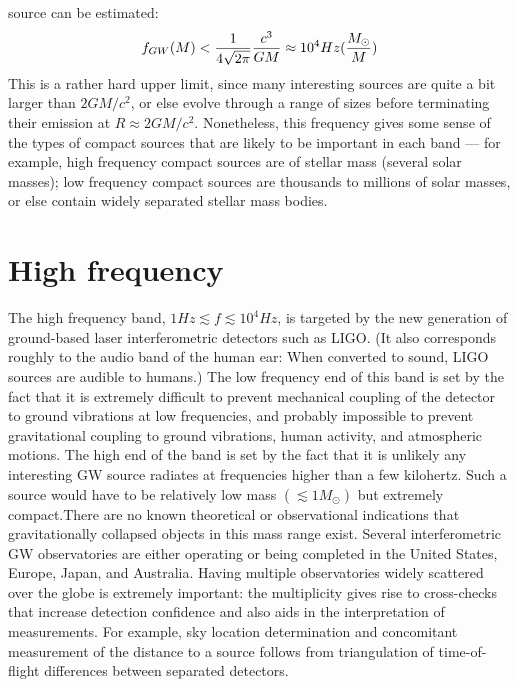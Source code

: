 \documentclass[binding=0.6cm, LaM]{sapthesis}
\begin{document}
 source can be estimated:
\begin{equation}
f_{GW}(M) < {1 \over {4\sqrt{2 \pi}}}{{c^3}\over{GM}} \approx 10^4 Hz ({{M_{\odot}} \over M})
\end{equation}
This is a rather hard upper limit, since many interesting sources are quite a bit larger than $2GM/c^2$, or else evolve through a range of sizes before terminating their emission at
 $R \approx 2GM/c^2$. Nonetheless, this frequency gives some sense of the types of compact sources that are likely to be important in each band — for example,
high frequency compact sources are of stellar mass (several solar masses);
low frequency compact sources are thousands to millions of solar masses, or else contain widely separated stellar mass bodies.



\section{High frequency}
The high frequency band, $1Hz \apprle f \apprle 10^4 Hz$, is targeted by the new generation of ground-based laser interferometric detectors such as LIGO.
(It also corresponds roughly to the audio band of the human ear: When converted to sound, LIGO sources are audible to humans.)
The low frequency end of this band is set by the fact that it is extremely difficult to prevent mechanical coupling of the detector to ground vibrations at low frequencies,
and probably impossible to prevent gravitational coupling to ground vibrations, human activity, and atmospheric motions.
The high end of the band is set by the fact that it is unlikely any interesting GW source radiates at frequencies higher than a few kilohertz. Such a source would have to be relatively
low mass $(\apprle 1M_{\odot})$ but extremely compact.There are no known theoretical or observational indications that gravitationally collapsed objects in this mass range exist.
Several interferometric GW observatories are either operating or being completed in the United States, Europe, Japan, and Australia.
Having multiple observatories widely scattered over the globe is extremely important: the multiplicity gives rise to cross-checks that increase detection confidence and also aids in the interpretation
 of measurements. For example, sky location determination and concomitant measurement of the distance to a source follows from triangulation of time-of-flight differences between separated detectors.
\end{document}
